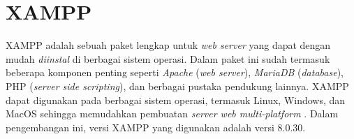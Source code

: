 \section{XAMPP}
XAMPP adalah sebuah paket lengkap untuk \textit{web server} yang dapat dengan mudah \textit{diinstal} di berbagai sistem operasi. Dalam paket ini sudah termasuk beberapa komponen penting seperti \textit{Apache} (\textit{web server}), \textit{MariaDB} (\textit{database}), PHP (\textit{server side scripting}), dan berbagai pustaka pendukung lainnya. XAMPP dapat digunakan pada berbagai sistem operasi, termasuk Linux, Windows, dan MacOS sehingga memudahkan pembuatan \textit{server web multi-platform} \cite{pakpahan2020sistem}. Dalam pengembangan ini, versi XAMPP yang digunakan adalah versi 8.0.30.

